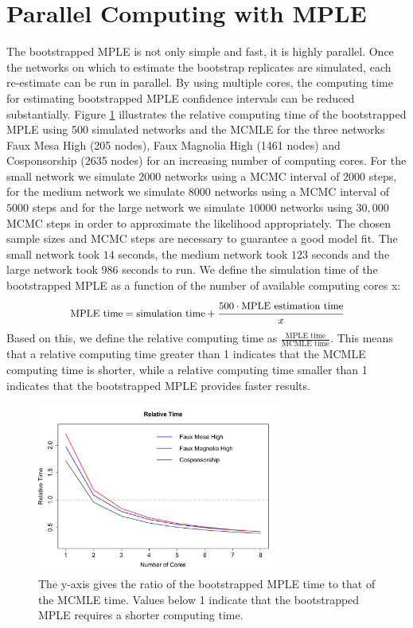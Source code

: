 \documentclass[10pt, conference, compsocconf]{IEEEtran}
\begin{document}
\section{Parallel Computing with MPLE}
The bootstrapped MPLE is not only simple and fast, it is highly parallel. Once the networks on which to estimate the bootstrap replicates are simulated, each re-estimate can be run in parallel. By using multiple cores, the computing time for estimating bootstrapped MPLE confidence intervals can be reduced substantially. Figure \ref{comptime} illustrates the relative computing time of the bootstrapped MPLE using 500 simulated networks and the MCMLE for the three networks Faux Mesa High (205 nodes), Faux Magnolia High (1461 nodes) and Cosponsorship (2635 nodes) for an increasing number of computing cores. For the small network we simulate $2000$ networks using a MCMC interval of $2000$ steps, for the medium network we simulate $8000$ networks using a MCMC interval of $5000$ steps and for the large network we simulate $10000$ networks using $30,000$ MCMC steps in order to approximate the likelihood appropriately. The chosen sample sizes and MCMC steps are necessary to guarantee a good model fit. The small network took $14$ seconds, the medium network took $123$ seconds and the large network took $986$ seconds to run. We define the simulation time of the bootstrapped MPLE as a function of the number of available computing cores x:
\begin{equation*}
\small
\begin{split}
\text{MPLE time} =  \text{simulation time} + \cfrac{500 \cdot\text{MPLE estimation time}}{x}
\end{split}
\end{equation*}     
Based on this, we define the relative computing time as
$\frac{\text{MPLE time}}{\text{MCMLE time}}$.
This means that a relative computing time greater than 1 indicates that the MCMLE computing time is shorter, while a relative computing time smaller than 1 indicates that the bootstrapped MPLE provides faster results. \\
\begin{figure}
\includegraphics[width=8cm]{rel_time} 
\caption{The y-axis gives the ratio of the bootstrapped MPLE time to that of the MCMLE time. Values below 1 indicate that the bootstrapped MPLE requires a shorter computing time.} \label{comptime}
\vspace{-.5cm}
\end{figure}
\end{document}

